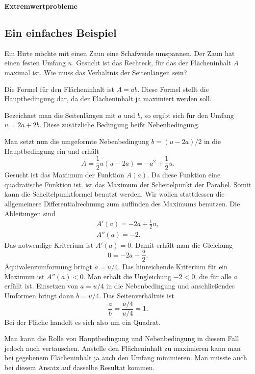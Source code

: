 \documentclass[a4paper,11pt,fleqn,twocolumn,twoside,dvipdfmx]{scrartcl}
\begin{document}
\setlength{\baselineskip}{13pt}

\noindent
{\LARGE\textbf{Extremwertprobleme}}


\subsection*{Ein einfaches Beispiel}

Ein Hirte möchte mit einen Zaun eine Schafweide umspannen.
Der Zaun hat einen festen Umfang $u$. Gesucht ist das Rechteck,
für das der Flächeninhalt $A$ maximal ist. Wie muss das Verhältnis
der Seitenlängen sein?

Die Formel für den Flächeninhalt ist $A=ab$. Diese Formel stellt
die Hauptbedingung dar, da der Flächeninhalt ja maximiert werden soll.

Bezeichnet man die Seitenlängen mit $a$ und $b$, so ergibt sich
für den Umfang $u=2a+2b$. Diese zusätzliche Bedingung heißt
Nebenbedingung.

Man setzt nun die umgeformte Nebenbedingung $b=(u-2a)/2$ in die
Hauptbedingung ein und erhält
\[A = \frac{1}{2}a(u-2a) = -a^2+\frac{1}{2}u.\]
Gesucht ist das Maximum der Funktion $A(a)$. Da diese Funktion
eine quadratische Funktion ist, ist das Maximum der Scheitelpunkt
der Parabel. Somit kann die Scheitelpunktformel benutzt werden.
Wir wollen stattdessen die allgemeinere Differentialrechnung zum
auffinden des Maximums benutzen. Die Ableitungen sind
\begin{gather*}
A'(a) = -2a+\frac{1}{2}u,\\
A''(a) = -2.
\end{gather*}
Das notwendige Kriterium ist $A'(a)=0$. Damit erhält  man die
Gleichung
\[0=-2a+\frac{u}{2}.\]
Äquivalenzumformung bringt $a=u/4$. Das hinreichende Kriterium
für ein Maximum ist $A''(a)<0$. Man erhält die Ungleichung $-2<0$,
die für alle $a$ erfüllt ist. Einsetzen von $a=u/4$ in die Nebenbedingung
und anschließendes Umformen bringt dann $b=u/4$. Das Seitenverhältnis
ist
\[\frac{a}{b} = \frac{u/4}{u/4} = 1.\]
Bei der Fläche handelt es sich also um ein Quadrat.

Man kann die Rolle von Hauptbedingung und Nebenbedingung in diesem
Fall jedoch auch vertauschen. Anstelle den Flächeninhalt zu maximieren
kann man bei gegebenem Flächeninhalt ja auch den Umfang minimieren.
Man müsste auch bei diesem Ansatz auf dasselbe Resultat kommen.
\end{document}
